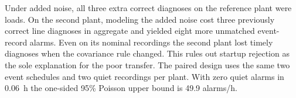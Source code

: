 Under added noise, all three extra correct diagnoses on the reference
plant were loads. On the second plant, modeling the added noise cost
three previously correct line diagnoses in aggregate and yielded
eight more unmatched event-record alarms. Even on its nominal
recordings the second plant lost timely diagnoses when the covariance
rule changed. This rules out startup rejection as the sole explanation
for the poor transfer. The paired design uses the same two event
schedules and two quiet recordings per plant. With zero quiet alarms
in 0.06~h the one-sided 95\% Poisson upper bound is 49.9 alarms/h.
